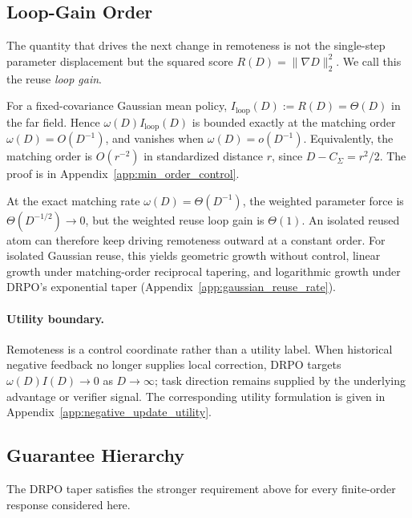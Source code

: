 \documentclass[sigconf,anonymous,review]{acmart}
\theoremstyle{acmdefinition}
\begin{document}
\subsection{Loop-Gain Order}
\label{subsec:min_order_control}

The quantity that drives the next change in remoteness is not the
single-step parameter displacement but the squared score
\(R(D)=\|\nabla D\|_2^2\). We call this the reuse \emph{loop gain}.

\begin{proposition}
\label{prop:loop_gain_order}
For a fixed-covariance Gaussian mean policy,
\(I_{\mathrm{loop}}(D):=R(D)=\Theta(D)\) in the far field. Hence
\(\omega(D)I_{\mathrm{loop}}(D)\) is bounded exactly at the matching
order \(\omega(D)=O(D^{-1})\), and vanishes when
\(\omega(D)=o(D^{-1})\). Equivalently, the matching order is
\(O(r^{-2})\) in standardized distance \(r\), since
\(D-C_\Sigma=r^2/2\). The proof is in
Appendix~\ref{app:min_order_control}.
\end{proposition}

At the exact matching rate \(\omega(D)=\Theta(D^{-1})\), the weighted
parameter force is \(\Theta(D^{-1/2})\to0\), but the weighted reuse loop
gain is \(\Theta(1)\). An isolated reused atom can therefore keep driving
remoteness outward at a constant order. For isolated Gaussian reuse,
this yields geometric growth without control, linear growth under
matching-order reciprocal tapering, and logarithmic growth under
DRPO's exponential taper
(Appendix~\ref{app:gaussian_reuse_rate}).

\paragraph{Utility boundary.}
\label{subsec:distance_dependent_utility}
Remoteness is a control coordinate rather than a utility label. When
historical negative feedback no longer supplies local correction, DRPO
targets \(\omega(D)I(D)\to0\) as \(D\to\infty\); task direction remains
supplied by the underlying advantage or verifier signal. The corresponding
utility formulation is given in
Appendix~\ref{app:negative_update_utility}.

\subsection{Guarantee Hierarchy}
\label{sec:exponential_taper}

The DRPO taper satisfies the stronger requirement above for every
finite-order response considered here.
\end{document}
